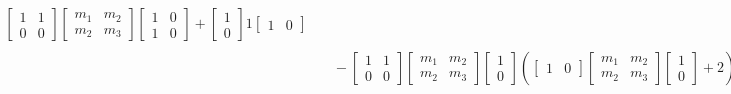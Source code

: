 \begin{enumerate}
\begin{align*}
\begin{bmatrix}
                1 & 1 \\
                0 & 0
            \end{bmatrix} \begin{bmatrix}
                m_1 & m_2 \\
                m_2 & m_3
            \end{bmatrix} \begin{bmatrix}
                1 & 0 \\
                1 & 0
            \end{bmatrix} + \begin{bmatrix}
                1 \\
                0
            \end{bmatrix} 1 \begin{bmatrix}
                1 & 0
            \end{bmatrix} \\
        & \quad - \begin{bmatrix}
                1 & 1 \\
                0 & 0
            \end{bmatrix} \begin{bmatrix}
                m_1 & m_2 \\
                m_2 & m_3
            \end{bmatrix} \begin{bmatrix}
                1 \\
                0
            \end{bmatrix} \left( \begin{bmatrix}
                1 & 0
            \end{bmatrix} \begin{bmatrix}
                m_1 & m_2 \\
                m_2 & m_3
            \end{bmatrix} \begin{bmatrix}
                1 \\
                0
            \end{bmatrix} + 2 \right)^{-1} \begin{bmatrix}
                1 & 0
            \end{bmatrix} \begin{bmatrix}
                m_1 & m_2 \\
                m_2 & m_3
            \end{bmatrix} \begin{bmatrix}

\end{bmatrix}
\end{align*}
\end{enumerate}
